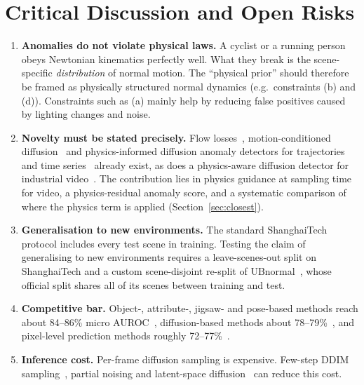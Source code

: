 \documentclass[11pt,a4paper]{article}
\begin{document}
\section{Critical Discussion and Open Risks}
\begin{enumerate}
  \item \textbf{Anomalies do not violate physical laws.} A cyclist or a running person obeys Newtonian kinematics perfectly well. What they break is the scene-specific \emph{distribution} of normal motion. The ``physical prior'' should therefore be framed as physically structured normal dynamics (e.g.\ constraints (b) and (d)). Constraints such as (a) mainly help by reducing false positives caused by lighting changes and noise.
  \item \textbf{Novelty must be stated precisely.} Flow losses~\cite{liu2018future}, motion-conditioned diffusion~\cite{tur2023unsupervised,flaborea2023multimodal,zhou2025video} and physics-informed diffusion anomaly detectors for trajectories and time series~\cite{sharma2025pidpm,soni2025pidm} already exist, as does a physics-aware diffusion detector for industrial video~\cite{paul2026mapvd}. The contribution lies in physics guidance at sampling time for video, a physics-residual anomaly score, and a systematic comparison of where the physics term is applied (Section~\ref{sec:closest}).
  \item \textbf{Generalisation to new environments.} The standard ShanghaiTech protocol includes every test scene in training. Testing the claim of generalising to new environments requires a leave-scenes-out split on ShanghaiTech and a custom scene-disjoint re-split of UBnormal~\cite{acsintoae2022ubnormal}, whose official split shares all of its scenes between training and test.
  \item \textbf{Competitive bar.} Object-, attribute-, jigsaw- and pose-based methods reach about 84--86\% micro AUROC~\cite{reiss2022attribute,hirschorn2023normalizing,wang2022jigsaw}, diffusion-based methods about 78--79\%~\cite{yan2023feature,zhou2025video}, and pixel-level prediction methods roughly 72--77\%~\cite{liu2018future,liu2021hybrid}.
  \item \textbf{Inference cost.} Per-frame diffusion sampling is expensive. Few-step DDIM sampling~\cite{song2021ddim}, partial noising and latent-space diffusion~\cite{rombach2022ldm} can reduce this cost.
\end{enumerate}

\end{document}
